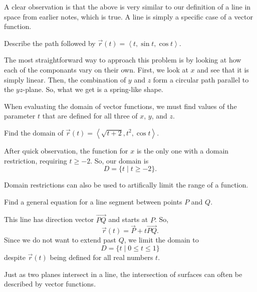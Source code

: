 A clear observation is that the above is very similar to our definition of a line in space from earlier notes, which is true. A line is simply a specific case of a vector function.

\begin{example}
    Describe the path followed by $\vec{r}(t) = \left<t, \sin t, \cos t\right>$.

    \begin{soln}
        The most straightforward way to approach this problem is by looking at how each of the componants vary on their own. First, we look at $x$ and see that it is simply linear. Then, the combination of $y$ and $z$ form a circular path parallel to the $yz$-plane. So, what we get is a spring-like shape.
    \end{soln}
\end{example}

When evaluating the domain of vector functions, we must find values of the parameter $t$ that are defined for all three of $x$, $y$, and $z$.

\begin{example}
    Find the domain of $\vec{r}(t) = \left<\sqrt{t + 2}, t^{2}, \cos t\right>$.

    \begin{soln}
        After quick observation, the function for $x$ is the only one with a domain restriction, requiring $t \geq -2$. So, our domain is
        \[D = \{t \mid t \geq -2\}.\]
    \end{soln}
\end{example}

Domain restrictions can also be used to artifically limit the range of a function.

\begin{example}
    Find a general equation for a line segment between points $P$ and $Q$.

    \begin{soln}
        This line has direction vector $\vec{PQ}$ and starts at $P$. So,
        \[\vec{r}(t) = \vec{P} + t\vec{PQ}.\]
        Since we do not want to extend past $Q$, we limit the domain to
        \[D = \{t \mid 0 \leq t \leq 1\}\]
        despite $\vec{r}(t)$ being defined for all real numbers $t$.
    \end{soln}
\end{example}

Just as two planes intersect in a line, the intersection of surfaces can often be described by vector functions.

